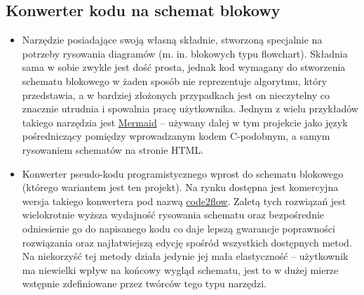 	\subsection{Konwerter kodu na schemat blokowy} 	
	\begin{itemize}
	\item
	Narzędzie posiadające swoją własną składnie, stworzoną specjalnie na potrzeby rysowania diagramów (m. in. blokowych typu flowchart). Składnia sama w sobie zwykle jest dość prosta, jednak kod wymagany do stworzenia schematu blokowego w żaden sposób nie reprezentuje algorytmu, który przedstawia, a w bardziej złożonych przypadkach jest on nieczytelny co znacznie utrudnia i spowalnia pracę użytkownika. Jednym z wielu przykładów takiego narzędzia jest \href{https://mermaid-js.github.io/mermaid/#/}{Mermaid} -- używany dalej w tym projekcie jako język pośredniczący pomiędzy wprowadzanym kodem C-podobnym, a samym rysowaniem schematów na stronie HTML.
	
	\item
	Konwerter pseudo-kodu programistycznego wprost do schematu blokowego (którego wariantem jest ten projekt). Na rynku dostępna jest komercyjna wersja takiego konwertera pod nazwą \href{https://code2flow.com}{code2flow}. Zaletą tych rozwiązań jest wielokrotnie wyższa wydajność rysowania schematu oraz bezpośrednie odniesienie go do napisanego kodu co daje lepszą gwarancje poprawności rozwiązania oraz najłatwiejszą edycję spośród wszystkich dostępnych metod. Na niekorzyść tej metody działa jedynie jej mała elastyczność -- użytkownik ma niewielki wpływ na końcowy wygląd schematu, jest to w dużej mierze wstępnie zdefiniowane przez twórców tego typu narzędzi.
	\end{itemize}
	

